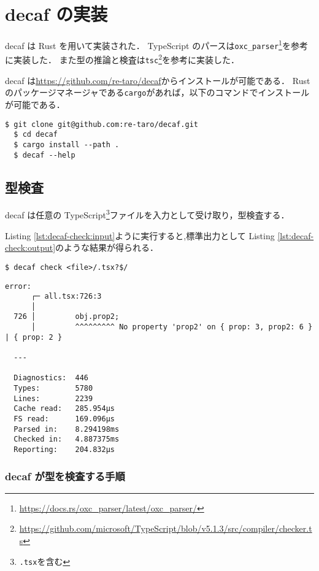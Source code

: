 \chapter{decaf の実装}

decaf は Rust を用いて実装された．
TypeScript のパースは\texttt{oxc\_parser}\footnote{\url{https://docs.rs/oxc_parser/latest/oxc_parser/}}を参考に実装した．
また型の推論と検査は\texttt{tsc}\footnote{\url{https://github.com/microsoft/TypeScript/blob/v5.1.3/src/compiler/checker.ts}}を参考に実装した．

decaf は\url{https://github.com/re-taro/decaf}からインストールが可能である．
Rust のパッケージマネージャである\texttt{cargo}があれば，以下のコマンドでインストールが可能である．

\begin{lstlisting}[caption=decaf のインストール]
  $ git clone git@github.com:re-taro/decaf.git
  $ cd decaf
  $ cargo install --path .
  $ decaf --help
\end{lstlisting}

\section{型検査}

decaf は任意の TypeScript\footnote{\texttt{.tsx}を含む}ファイルを入力として受け取り，型検査する．

Listing \ref{lst:decaf-check:input}ように実行すると,標準出力として Listing \ref{lst:decaf-check:output}のような結果が得られる．

\begin{lstlisting}[caption=decaf の型検査, label=lst:decaf-check:input]
  $ decaf check <file>/.tsx?$/
\end{lstlisting}

\begin{lstlisting}[caption=decaf の型検査結果, label=lst:decaf-check:output]
  error:
      ┌─ all.tsx:726:3
      │
  726 │         obj.prop2;
      │         ^^^^^^^^^ No property 'prop2' on { prop: 3, prop2: 6 } | { prop: 2 }

  ---

  Diagnostics:	446
  Types:      	5780
  Lines:      	2239
  Cache read: 	285.954µs
  FS read:    	169.096µs
  Parsed in:  	8.294198ms
  Checked in: 	4.887375ms
  Reporting:  	204.832µs
\end{lstlisting}

\subsection{decaf が型を検査する手順}
\label{sec:decaf-check}

